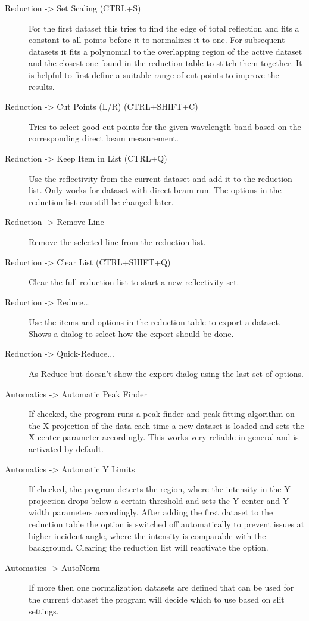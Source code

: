 \begin{description}
   \item[{ Reduction -> Set Scaling (CTRL+S)}] For the first dataset this tries to find the edge of total reflection and fits a constant to all points before it to normalizes it to one. For subsequent datasets it fits a polynomial to the overlapping region of the active dataset and the closest one found in the reduction table to stitch them together. It is helpful to first define a suitable range of cut points to improve the results.
   \item[{ Reduction -> Cut Points (L/R) (CTRL+SHIFT+C)}] Tries to select good cut points for the given wavelength band based on the corresponding direct beam measurement.
   \item[{ Reduction -> Keep Item in List (CTRL+Q)}] Use the reflectivity from the current dataset and add it to the reduction list. Only works for dataset with direct beam run. The options in the reduction list can still be changed later.
   \item[{ Reduction -> Remove Line}] Remove the selected line from the reduction list.
   \item[{ Reduction -> Clear List (CTRL+SHIFT+Q)}] Clear the full reduction list to start a new reflectivity set.

    \item[{ Reduction -> Reduce...}] Use the items and options in the reduction table to export a dataset. Shows a dialog to select how the export should be done.
    \item[ Reduction -> Quick-Reduce...] As Reduce but doesn't show the export dialog using the last set of options.
    
   \item[{ Automatics -> Automatic Peak Finder}] If checked, the program runs a peak finder and peak fitting algorithm on the X-projection of the data each time a new dataset is loaded and sets the X-center parameter accordingly. This works very reliable in general and is activated by default.
   \item[{ Automatics -> Automatic Y Limits}] If checked, the program detects the region, where the intensity in the Y-projection drops below a certain threshold and sets the Y-center and Y-width parameters accordingly. After adding the first dataset to the reduction table the option is switched off automatically to prevent issues at higher incident angle, where the intensity is comparable with the background. Clearing the reduction list will reactivate the option.
    \item[{ Automatics -> AutoNorm}] If more then one normalization datasets are defined that can be used for the current dataset the program will decide which to use based on slit settings.


\end{description}
